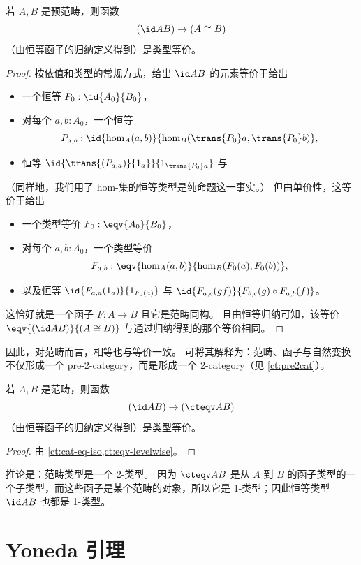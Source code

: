 \begin{lem}\label{ct:cat-eq-iso}
  若 $A,B$ 是预范畴，则函数
  \[(\id A B) \to (A\cong B)\]
  （由恒等函子的归纳定义得到）是类型等价。
\end{lem}
\begin{proof}
  按依值和类型的常规方式，给出 $\id A B$ 的元素等价于给出
  \begin{itemize}
  \item 一个恒等 $P_0:\id{A_0}{B_0}$，
  \item 对每个 $a,b:A_0$，一个恒等
    \[P_{a,b}:\id{\hom_A(a,b)}{\hom_B(\trans {P_0} a,\trans {P_0} b)},\]
  \item 恒等 $\id{\trans {(P_{a,a})} {1_a}}{1_{\trans {P_0} a}}$ 与
  \end{itemize}
  （同样地，我们用了 hom-集的恒等类型是纯命题这一事实。）
  但由单价性，这等价于给出
  \begin{itemize}
  \item 一个类型等价 $F_0:\eqv{A_0}{B_0}$，
  \item 对每个 $a,b:A_0$，一个类型等价
    \[F_{a,b}:\eqv{\hom_A(a,b)}{\hom_B(F_0 (a),F_0 (b))},\]
  \item 以及恒等 $\id{F_{a,a}(1_a)}{1_{F_0 (a)}}$ 与 $\id{F_{a,c}(gf)}{F_{b,c} (g)\circ F_{a,b} (f)}$。
  \end{itemize}
  这恰好就是一个函子 $F:A\to B$ 且它是范畴同构。
  且由恒等归纳可知，该等价 $\eqv{(\id A B)}{(A\cong B)}$ 与通过归纳得到的那个等价相同。
\end{proof}

因此，对范畴而言，相等也与等价一致。
可将其解释为：范畴、函子与自然变换不仅形成一个 pre-2-category，而是形成一个 2-category（见 \cref{ct:pre2cat}）。

\begin{thm}\label{ct:cat-2cat}
  若 $A,B$ 是范畴，则函数
  \[(\id A B) \to (\cteqv A B)\]
  （由恒等函子的归纳定义得到）是类型等价。
\end{thm}
\begin{proof}
  由 \cref{ct:cat-eq-iso,ct:eqv-levelwise}。
\end{proof}

推论是：范畴类型是一个 2-类型。
因为 $\cteqv A B$ 是从 $A$ 到 $B$ 的函子类型的一个子类型，而这些函子是某个范畴的对象，所以它是 1-类型；因此恒等类型 $\id A B$ 也都是 1-类型。
\section{Yoneda 引理}
\label{sec:yoneda}

